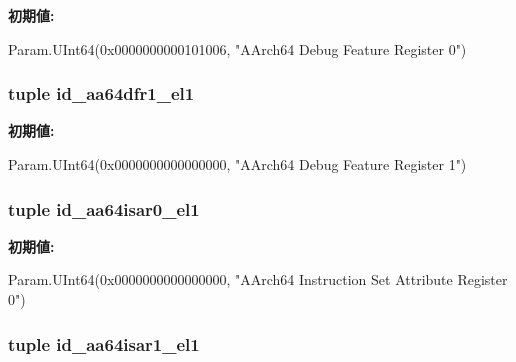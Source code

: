 \label{classArmISA_1_1ArmISA_a2acdc720c9a09cc3d721207930c48216}
{\bfseries 初期値:}
\begin{DoxyCode}
Param.UInt64(0x0000000000101006,
        "AArch64 Debug Feature Register 0")
\end{DoxyCode}
\hypertarget{classArmISA_1_1ArmISA_a4e541a138caa99addfa97b61770450ab}{
\subsubsection[{id\_\-aa64dfr1\_\-el1}]{\setlength{\rightskip}{0pt plus 5cm}tuple {\bf id\_\-aa64dfr1\_\-el1}}}
\label{classArmISA_1_1ArmISA_a4e541a138caa99addfa97b61770450ab}
{\bfseries 初期値:}
\begin{DoxyCode}
Param.UInt64(0x0000000000000000,
        "AArch64 Debug Feature Register 1")
\end{DoxyCode}
\hypertarget{classArmISA_1_1ArmISA_a4d97d046da9986f95c22a914629decdd}{
\subsubsection[{id\_\-aa64isar0\_\-el1}]{\setlength{\rightskip}{0pt plus 5cm}tuple {\bf id\_\-aa64isar0\_\-el1}}}
\label{classArmISA_1_1ArmISA_a4d97d046da9986f95c22a914629decdd}
{\bfseries 初期値:}
\begin{DoxyCode}
Param.UInt64(0x0000000000000000,
        "AArch64 Instruction Set Attribute Register 0")
\end{DoxyCode}
\hypertarget{classArmISA_1_1ArmISA_af6b7dfad4c11bc8baa25694d43bfd3e5}{
\subsubsection[{id\_\-aa64isar1\_\-el1}]{\setlength{\rightskip}{0pt plus 5cm}tuple {\bf id\_\-aa64isar1\_\-el1}}}
